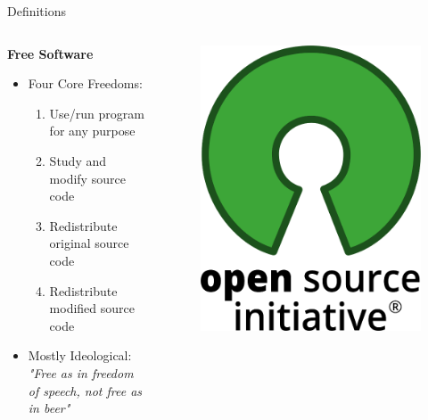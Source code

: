 \documentclass[9pt, dvipsnames]{beamer}
\begin{document}
\begin{frame}{Definitions}
{\begin{columns}[t]
\begin{column}{0.5\textwidth}
\begin{figure}
                \end{figure}
                \textbf{Free Software}
                \begin{itemize}
                    \item Four Core Freedoms:
                        \begin{enumerate}
                            \item Use/run program for any purpose
                            \item Study and modify source code
                            \item Redistribute original source code
                            \item Redistribute modified source code
                        \end{enumerate}
                    \item Mostly Ideological: \\ \textit{"Free as in freedom of
                    speech, not free as in beer"}
                \end{itemize}
            \end{column}
             {
                \begin{column}{0.5\textwidth}
                    \begin{figure}
                        \centering
                        \includegraphics[height=0.2\paperheight]{assets/OSI.png}

\end{figure}
\end{column}}
\end{columns}}
\end{frame}
\end{document}
